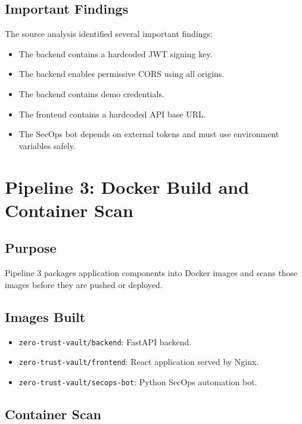 \documentclass[12pt,a4paper]{report}
\begin{document}
\subsection{Important Findings}

The source analysis identified several important findings:

\begin{itemize}[leftmargin=*]
    \item The backend contains a hardcoded JWT signing key.
    \item The backend enables permissive CORS using all origins.
    \item The backend contains demo credentials.
    \item The frontend contains a hardcoded API base URL.
    \item The SecOps bot depends on external tokens and must use environment variables safely.
\end{itemize}

\section{Pipeline 3: Docker Build and Container Scan}

\subsection{Purpose}

Pipeline 3 packages application components into Docker images and scans those images before they are pushed or deployed.

\subsection{Images Built}

\begin{itemize}[leftmargin=*]
    \item \texttt{zero-trust-vault/backend}: FastAPI backend.
    \item \texttt{zero-trust-vault/frontend}: React application served by Nginx.
    \item \texttt{zero-trust-vault/secops-bot}: Python SecOps automation bot.
\end{itemize}

\subsection{Container Scan}
\end{document}
